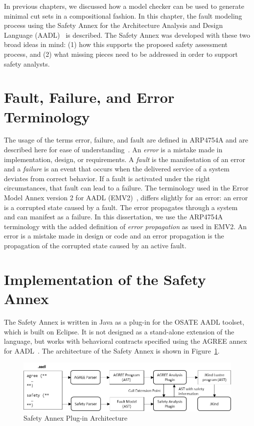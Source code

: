 In previous chapters, we discussed how a model checker can be used to generate minimal cut sets in a compositional fashion. In this chapter, the fault modeling process using the Safety Annex for the Architecture Analysis and Design Language (AADL)~\cite{AADL_Standard} is described. The Safety Annex was developed with these two broad ideas in mind: (1) how this supports the proposed safety assessment process, and (2) what missing pieces need to be addressed in order to support safety analysts. 

\section{Fault, Failure, and Error Terminology}
The usage of the terms error, failure, and fault are defined in ARP4754A and are described here for ease of understanding~\cite{SAE:ARP4754A}. An \textit{error} is a mistake made in implementation, design, or requirements. A \textit{fault} is the manifestation of an error and a \textit{failure} is an event that occurs when the delivered service of a system deviates from correct behavior. If a fault is activated under the right circumstances, that fault can lead to a failure. The terminology used in the Error Model Annex version 2 for AADL (EMV2)~\cite{EMV2}, differs slightly for an error: an error is a corrupted state caused by a fault. The error propagates through a system and can manifest as a failure. In this dissertation, we use the ARP4754A terminology with the added definition of \textit{error propagation} as used in EMV2. An error is a mistake made in design or code and an error propagation is the propagation of the corrupted state caused by an active fault. 

\section{Implementation of the Safety Annex}
The Safety Annex is written in Java as a plug-in for the OSATE AADL toolset, which is built on Eclipse.  It is not designed as a stand-alone extension of the language, but works with behavioral contracts specified using the AGREE annex for AADL~\cite{NFM2012:CoGaMiWhLaLu}. 
The architecture of the Safety Annex is shown in Figure~\ref{fig:plugin-arch}.

\begin{figure}[h]
	\begin{center}
		\includegraphics[width=\textwidth]{images/arch.png}
	\end{center}
	\caption{Safety Annex Plug-in Architecture}
	\label{fig:plugin-arch}
\end{figure}

